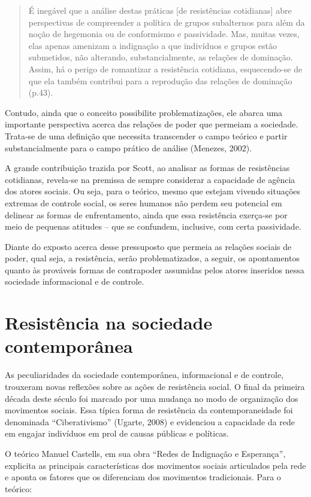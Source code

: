 \begin{quote}
É inegável que a análise destas práticas {[}de resistências
cotidianas{]} abre perspectivas de compreender a política de grupos
subalternos para além da noção de hegemonia ou de conformismo e
passividade. Mas, muitas vezes, elas apenas amenizam a indignação a que
indivíduos e grupos estão submetidos, não alterando, substancialmente,
as relações de dominação. Assim, há o perigo de romantizar a resistência
cotidiana, esquecendo-se de que ela também contribui para a reprodução
das relações de dominação (p.43).
\end{quote}

Contudo, ainda que o conceito possibilite problematizações, ele abarca
uma importante perspectiva acerca das relações de poder que permeiam a
sociedade. Trata-se de uma definição que necessita transcender o campo
teórico e partir substancialmente para o campo prático de análise
(Menezes, 2002).

A grande contribuição trazida por Scott, ao analisar as formas de
resistências cotidianas, revela-se na premissa de sempre considerar a
capacidade de agência dos atores sociais. Ou seja, para o teórico, mesmo
que estejam vivendo situações extremas de controle social, os seres
humanos não perdem seu potencial em delinear as formas de enfrentamento,
ainda que essa resistência exerça-se por meio de pequenas atitudes --
que se confundem, inclusive, com certa passividade.

Diante do exposto acerca desse pressuposto que permeia as relações
sociais de poder, qual seja, a resistência, serão problematizados, a
seguir, os apontamentos quanto às prováveis formas de contrapoder
assumidas pelos atores inseridos nessa sociedade informacional e de
controle.

\section{Resistência na sociedade contemporânea}

As peculiaridades da sociedade contemporânea, informacional e de
controle, trouxeram novas reflexões sobre as ações de resistência
social. O final da primeira década deste século foi marcado por uma
mudança no modo de organização dos movimentos sociais. Essa típica forma
de resistência da contemporaneidade foi denominada ``Ciberativismo''
(Ugarte, 2008) e evidenciou a capacidade da rede em engajar indivíduos
em prol de causas públicas e políticas.

O teórico Manuel Castells, em sua obra ``Redes de Indignação e
Esperança'', explicita as principais características dos movimentos
sociais articulados pela rede e aponta os fatores que os diferenciam dos
movimentos tradicionais. Para o teórico:

